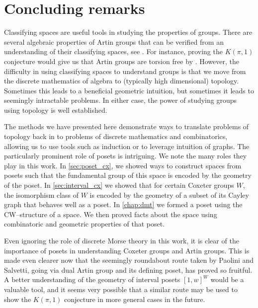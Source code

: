 \documentclass[class=article, crop=false]{standalone}
\begin{document}
\section{Concluding remarks}

Classifying spaces are useful tools in studying the properties of groups. There are several algebraic properties of Artin groups that can be verified from an understanding of their classifying spaces, see \cite{charney_problems_2008}. For instance, proving the $K(\pi,1)$ conjecture would give us that Artin groups are torsion free by \cite[Proposition 2.45]{hatcher_algebraic_2001}. However, the difficulty in using classifying spaces to understand groups is that we move from the discrete mathematics of algebra to (typically high dimensional) topology. Sometimes this leads to a beneficial geometric intuition, but sometimes it leads to seemingly intractable problems. In either case, the power of studying groups using topology is well established.

The methods we have presented here demonstrate ways to translate problems of topology back in to problems of discrete mathematics and combinatorics, allowing us to use tools such as induction or to leverage intuition of graphs. 
The particularly prominent role of posets is intriguing. We note the many roles they play in this work. In \cref{sec:poset_cx}, we showed ways to construct spaces from posets such that the fundamental group of this space is encoded by the geometry of the poset. In \cref{sec:interval_cx} we showed that for certain Coxeter groups $W$, the isomorphism class of $W$ is encoded by the geometry of a subset of its Cayley graph that behaves well as a poset. In \cref{chap:dmt} we formed a poset using the CW--structure of a space. We then proved facts about the space using combinatoric and geometric properties of that poset.

Even ignoring the role of discrete Morse theory in this work, it is clear of the importance of posets in understanding Coxeter groups and Artin groups. This is made even clearer now that the seemingly roundabout route taken by Paolini and Salvetti, going via dual Artin group and its defining poset, has proved so fruitful. A better understanding of the geometry of interval posets $[1,w]^W$ would be a valuable tool, and it seems very possible that a similar route may be used to show the $K(\pi,1)$ conjecture in more general cases in the future.
\end{document}
